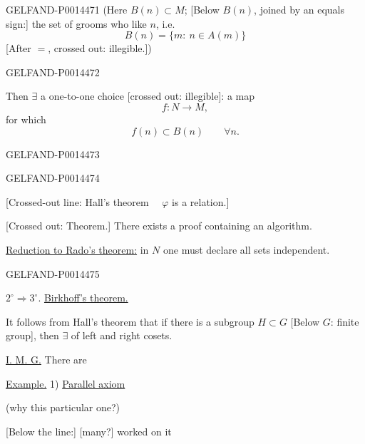 \begin{GelfandAdjacentEvidence}{GELFAND-P001447}{1}
(Here \(B(n)\subset M\);
[Below \(B(n)\), joined by an equals sign:] the set of grooms who like \(n\), i.e.
\[
B(n)=\{m:\ n\in A(m)\}
\]
[After \(=\), crossed out: illegible.])
\end{GelfandAdjacentEvidence}
\begin{GelfandAdjacentEvidence}{GELFAND-P001447}{2}


Then \(\exists\) a one-to-one choice [crossed out: illegible]: a map
\[
f\colon N\longrightarrow M,
\]
for which
\[
f(n)\subset B(n)\qquad \forall n.
\]
\end{GelfandAdjacentEvidence}
\begin{GelfandAdjacentEvidence}{GELFAND-P001447}{3}

\end{GelfandAdjacentEvidence}
\begin{GelfandAdjacentEvidence}{GELFAND-P001447}{4}


[Crossed-out line: Hall’s theorem \(\quad\varphi\) is a relation.]

[Crossed out: Theorem.] There exists a proof containing an algorithm.

\uline{Reduction to Rado’s theorem:} in \(N\) one must declare all sets independent.
\end{GelfandAdjacentEvidence}
\begin{GelfandAdjacentEvidence}{GELFAND-P001447}{5}


\(2^\circ\Rightarrow3^\circ\). \uline{Birkhoff’s theorem.}

It follows from Hall’s theorem that if there is a subgroup \(H\subset G\)
[Below \(G\): finite group], then \(\exists\)  of left and right cosets.

\uline{I. M. G.} There are 

\uline{Example.} 1) \uline{Parallel axiom}

(why this particular one?)

[Below the line:] [many?] worked on it
\end{GelfandAdjacentEvidence}
